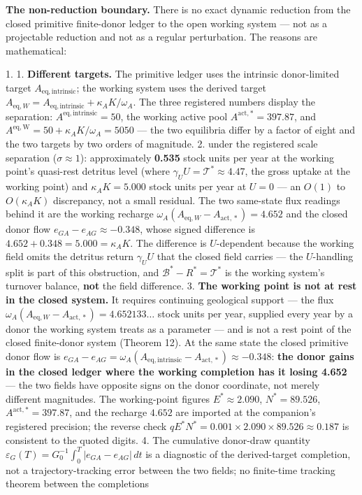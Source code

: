 \documentclass[11pt]{article}
\begin{document}
\textbf{The non-reduction boundary.} There is no exact dynamic reduction from the closed primitive finite-donor ledger to the open working system --- not as a projectable reduction and not as a regular perturbation. The reasons are mathematical:

1. 1. \textbf{Different targets.} The primitive ledger uses the intrinsic donor-limited target \(A_{\mathrm{eq,intrinsic}}\); the working system uses the derived target \(A_{\mathrm{eq},\allowbreak{}W}=\allowbreak{}A_{\mathrm{eq,\allowbreak{}intrinsic}}+\allowbreak{}\kappa_AK/\omega_A\). The three registered numbers display the separation: \(A^{\mathrm{eq,\allowbreak{}intrinsic}} =\allowbreak{} 50\), the working active pool \(A^{\mathrm{act,*}} = 397.87\), and \(A^{\mathrm{eq,\allowbreak{}W}} =\allowbreak{} 50 +\allowbreak{} \kappa_A K/\omega_A =\allowbreak{} 5050\) --- the two equilibria differ by a factor of eight and the two targets by two orders of magnitude. 2. under the registered scale separation (\(\sigma\approx1\)): approximately \textbf{0.535} stock units per year at the working point's quasi-rest detritus level (where \(\gamma_UU=\allowbreak{}\mathcal T^*\approx4.47\), the gross uptake at the working point) and \(\kappa_AK=\mathbf{5.000}\) stock units per year at \(U=0\) --- an \(O(1)\) to \(O(\kappa_AK)\) discrepancy, not a small residual. The two same-state flux readings behind it are the working recharge \(\omega_A(A_{\mathrm{eq},\allowbreak{}W}-A_{\mathrm{act},\allowbreak{}*})=\allowbreak{}4.652\) and the closed donor flow \(e_{GA}-e_{AG}\approx-0.348\), whose signed difference is \(4.652+0.348=5.000=\kappa_AK\). The difference is \(U\)-dependent because the working field omits the detritus return \(\gamma_UU\) that the closed field carries --- the \(U\)-handling split is part of this obstruction, and \(\mathcal B^*-R^*=\mathcal T^*\) is the working system's turnover balance, \textbf{not} the field difference. 3. \textbf{The working point is not at rest in the closed system.} It requires continuing geological support --- the flux \(\omega_A(A_{\mathrm{eq},\allowbreak{}W}-A_{\mathrm{act},\allowbreak{}*})=\allowbreak{}4.652133\ldots\) stock units per year, supplied every year by a donor the working system treats as a parameter --- and is not a rest point of the closed finite-donor system (Theorem 12). At the same state the closed primitive donor flow is \(e_{GA}-e_{AG}=\allowbreak{}\omega_A(A_{\mathrm{eq,\allowbreak{}intrinsic}}-A_{\mathrm{act},\allowbreak{}*})\approx-0.348\): \textbf{the donor gains in the closed ledger where the working completion has it losing 4.652} --- the two fields have opposite signs on the donor coordinate, not merely different magnitudes. The working-point figures \(E^* \approx 2.090\), \(N^* = 89.526\), \(A^{\mathrm{act,*}} = 397.87\), and the recharge \(4.652\) are imported at the companion's registered precision; the reverse check \(qE^*N^* =\allowbreak{} 0.001 \times 2.090 \times 89.526 \approx 0.187\) is consistent to the quoted digits. 4. The cumulative donor-draw quantity \(\varepsilon_G(T) =\allowbreak{} G_0^{-1}\int_0^T |e_{GA} - e_{AG}|\,\allowbreak{} dt\) is a diagnostic of the derived-target completion, not a trajectory-tracking error between the two fields; no finite-time tracking theorem between the completions 
\end{document}
